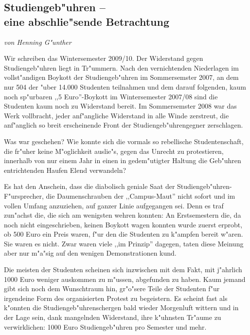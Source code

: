 \subsection[Studiengeb"uhren]{Studiengeb"uhren --\\ eine abschlie"sende
Betrachtung}
\emph{von Henning G"unther}


Wir schreiben das Wintersemester 2009/10.
Der Widerstand gegen Studiengeb"uhren liegt in Tr"ummern.
Nach den vernichtenden Niederlagen im voll\-st"an\-di\-gen Boykott der
Studiengeb"uhren im Sommersemster 2007, an dem nur 504 der "uber 14.000 Studenten teilnahmen und dem darauf folgenden, kaum noch sp"urbaren ,,5 Euro''-Boykott im Wintersemester 2007/08 sind die Studenten kaum noch zu Widerstand bereit. Im Sommersemster 2008 war das Werk vollbracht, jeder anf"angliche Widerstand in alle Winde zerstreut, die anf"anglich so breit erscheinende Front der Studiengeb"uhrengegner zerschlagen.

Was war geschehen?
Wie konnte sich die vormals so rebellische Studentenschaft, die fr"uher keine M"oglichkeit auslie"s, gegen das Unrecht zu protestieren, innerhalb von nur einem Jahr in einen in gedem"utigter Haltung die Geb"uhren entrichtenden Haufen Elend verwandeln?

Es hat den Anschein, dass die diabolisch geniale Saat der
Studiengeb"uhren-F"ursprecher, die Daumenschrauben der ,,Campus-Maut'' nicht
sofort und im vollen Umfang anzuziehen, auf ganzer Linie aufgegangen sei. Denn es traf zun"achst die, die sich am wenigsten wehren konnten: An Erstsemestern die, da noch nicht eingeschrieben, keinen Boykott wagen
konnten wurde zuerst erprobt, ob 500 Euro ein Preis waren, f"ur den die Studenten zu k"ampfen bereit w"aren. Sie waren es nicht.
Zwar waren viele ,,im Prinzip'' dagegen, taten diese Meinung aber nur m"a"sig
auf den wenigen Demonstrationen kund.

Die meisten der Studenten scheinen sich inzwischen mit dem Fakt, mit j"ahrlich
1000 Euro weniger auskommen zu m"ussen, abgefunden zu haben. Kaum jemand gibt sich noch dem Wunschtraum hin, gr"o"sere Teile der Studenten f"ur irgendeine Form des organisierten Protest zu begeistern.
Es scheint fast als k"onnten die Studiengeb"uhrenschergen bald wieder Morgenluft wittern und in der Lage sein, dank mangelnden Widerstand, ihre k"uhnsten Tr"aume zu verwirklichen: 1000 Euro Studiengeb"uhren pro Semester und mehr.

